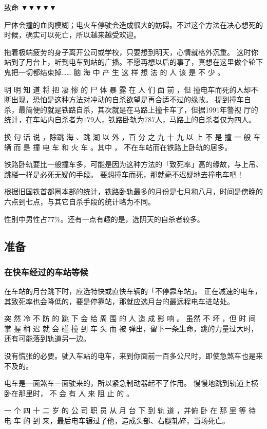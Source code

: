 \documentclass[UTF8]{ctexart}
\begin{document}
致命 ▼▼▼▼▼

尸体会撞的血肉模糊；电火车停驶会造成很大的妨碍。不过这个方法在决心想死的时候，确实可以死亡，所以越来越受欢迎。

拖着极端疲劳的身子离开公司或学校，只要想到明天，心情就格外沉重。
这时你站到了月台上，听到电车到站的广播。不愿再想以后的事了，真想在这里做个轮下鬼把一切都结束掉……
脑 海 中 产 生 这 样 想 法 的 人 该 是 不 少 。

明 明 知 道 将 把 凄 惨 的 尸 体 暴 露 在 人 们 面 前 ，但 撞电车而死的人却不断出现，恐怕是这种方法对冲动的自杀欲望是再合适不过的缘故。 提到撞车自杀，最简便的就是铁路自杀，其次就是在马路上撞卡车了，但据1991年警视 厅的统计，在车站内自杀者为$179$人，铁路卧轨为$787$人，马路上的自杀者仅为四人。

换 句 话 说 ，除跳 海 、跳 湖 以 外 ，百 分 之 九 十 九 以 上 不 是 撞 一 般 车 辆 而 是 撞 电 车 和 火 车 。其中 ， 不在车站而在铁路上卧轨的居多。

铁路卧轨要比一般撞车多，可能是因为这种方法的「致死率」高的缘故，与上吊、跳楼一样是必死无疑的手段。
要想撞车而死，那就毫不迟疑地去撞电车吧！

根据旧国铁首都圈本部的统计，铁路卧轨最多的月份是七月和八月，时间是傍晚的六点到七点，与其它自杀手段的统计略为不同。

性别中男性占$77\%$。还有一点有趣的是，选阴天的自杀者较多。

\subsection{准备}

\subsubsection*{在快车经过的车站等候}

在车站的月台跳下时，应选特快或直快车辆的「不停靠车站」。
正在减速的电车，其致死率也会降低的，要是停靠站，那就应选月台的最远程电车进站处。

突 然 冷 不 防 的 跳 下 会 给 周 围 的 人 造 成 影 响 。
虽然 不 坏 ，但 时 间 掌 握 稍 迟 就 会 碰 撞 到 车 头 而 被 弹出，留下一条生命，跳的力量过大时，还有可能落到轨道另一边。

没有慌张的必要。驶入车站的电车，来到你面前一百多公尺时，即使急煞车也是来不及的。 

电车是一面煞车一面驶来的，所以紧急制动器起不了作用。
慢慢地跳到轨道上横卧在那里时， 不 会 有 人 来 阻 止 的 。

一 个 四 十 二 岁 的 公 司 职 员 从 月 台 下 到 轨 道 ，并俯 卧 在 那 里 等 待 电 车 的 到 来，最后电车辗过了他，造成头部、右腿轧碎，当场死亡。 
\end{document}
